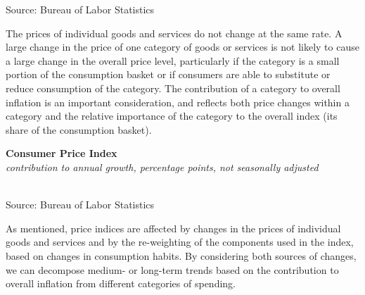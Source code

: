 \documentclass{report}
\newcommand{\tbllink}[1]{\href{https://raw.githubusercontent.com/bdecon/US-chartbook/master/chartbook/data/#1}{\faTable}}
\newcommand{\barylab}[2]{yticklabel style={text width=#1, align=right, 
		style={black!70}, text height=#2},}
\newcommand{\bbar}[2]{extra #1 ticks = {{#2}}, extra #1 tick labels = ,
		extra #1 tick style = {grid=major, grid style={thick, black!25}},}
\newcommand{\barplotnogrid}{xbar=0pt, axis line style={draw=none},
	    yticklabel style={align=left, anchor=east},
      		xmajorticks=false, ymajorgrids=false,   
	    ytick=data, tickwidth=0pt, area legend, reverse legend,
	    nodes near coords, nodes near coords align={horizontal},}
\begin{document}
{{\begin{minipage}{0.76\textwidth}
\footnotesize{Source: Bureau of Labor Statistics} \hfill \tbllink{cpi.csv}
\vspace{2mm}

\small The prices of individual goods and services do not change at the same rate. A large change in the price of one category of goods or services is not likely to cause a large change in the overall price level, particularly if the category is a small portion of the consumption basket or if consumers are able to substitute or reduce consumption of the category. The contribution of a category to overall inflation is an important consideration, and reflects both price changes within a category and the relative importance of the category to the overall index (its share of the consumption basket).
\end{minipage}

\begin{minipage}{0.29\textwidth}
\small 
\end{minipage} \hspace{5mm}
\begin{minipage}{0.42\textwidth}
\normalsize \textbf{Consumer Price Index}\\
\footnotesize{\textit{contribution to annual growth, percentage points, not seasonally adjusted}}\\
\\
\footnotesize{Source: Bureau of Labor Statistics} \hfill \tbllink{cpi_comp.csv}
\end{minipage}
\newpage
\begin{minipage}{0.76\textwidth}
\small As mentioned, price indices are affected by changes in the prices of individual goods and services and by the re-weighting of the components used in the index, based on changes in consumption habits. By considering both sources of changes, we can decompose medium- or long-term trends based on the contribution to overall inflation from different categories of spending. 


\end{minipage}}}
\end{document}
